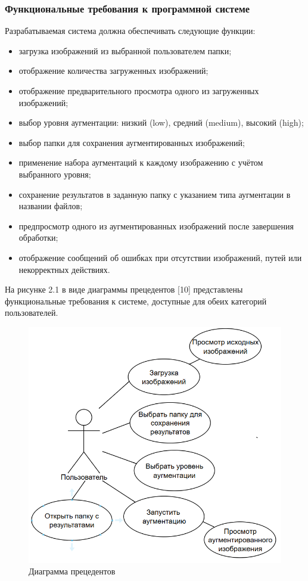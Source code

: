 \subsubsection{Функциональные требования к программной системе}

Разрабатываемая система должна обеспечивать следующие функции:

\begin{itemize}
	\item загрузка изображений из выбранной пользователем папки;
	\item отображение количества загруженных изображений;
	\item отображение предварительного просмотра одного из загруженных изображений;
	\item выбор уровня аугментации: низкий (low), средний (medium), высокий (high);
	\item выбор папки для сохранения аугментированных изображений;
	\item применение набора аугментаций к каждому изображению с учётом выбранного уровня;
	\item сохранение результатов в заданную папку с указанием типа аугментации в названии файлов;
	\item предпросмотр одного из аугментированных изображений после завершения обработки;
	\item отображение сообщений об ошибках при отсутствии изображений, путей или некорректных действиях.
\end{itemize}

На рисунке 2.1 в виде диаграммы прецедентов [10] представлены функциональные требования к системе, доступные для обеих категорий пользователей.

\begin{figure}[H]
	\centering
	\includegraphics[width=0.7\linewidth]{images/diagrampreced}
	\caption{Диаграмма прецедентов}
	\label{fig:diagrampreced}
\end{figure}


